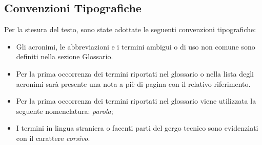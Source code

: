 \subsection{Convenzioni Tipografiche}
Per la stesura del testo, sono state adottate le seguenti convenzioni tipografiche:
\begin{itemize}
    \item Gli acronimi, le abbreviazioni e i termini ambigui o di uso non comune sono definiti nella sezione Glossario.
	\item Per la prima occorrenza dei termini riportati nel glossario o nella lista degli acronimi sarà presente una nota a piè di pagina con il relativo riferimento.
	\item Per la prima occorrenza dei termini riportati nel glossario viene utilizzata la seguente nomenclatura: \emph{parola}\glsfirstoccur;
	\item I termini in lingua straniera o facenti parti del gergo tecnico sono evidenziati con il carattere \emph{corsivo}.
\end{itemize}
